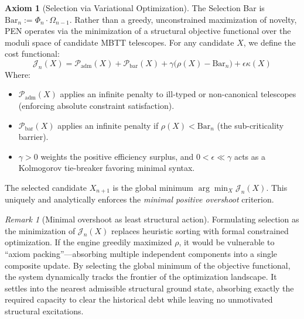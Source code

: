 \documentclass[11pt,a4paper]{article}
\theoremstyle{plain}
\theoremstyle{definition}
\newtheorem{axiom}[theorem]{Axiom}
\theoremstyle{remark}
\newtheorem{remark}[theorem]{Remark}
\begin{document}
\begin{axiom}[Selection via Variational Optimization]
\label{ax:selection}
The Selection Bar is $\mathrm{Bar}_n := \Phi_n \cdot \Omega_{n-1}$. Rather than a greedy, unconstrained maximization of novelty, PEN operates via the minimization of a structural objective functional over the moduli space of candidate MBTT telescopes. For any candidate $X$, we define the cost functional:
\begin{equation}
    \mathcal{J}_n(X) = \mathcal{P}_{\mathrm{adm}}(X) + \mathcal{P}_{\mathrm{bar}}(X) + \gamma \big( \rho(X) - \mathrm{Bar}_n \big) + \epsilon \kappa(X)
\end{equation}
Where:
\begin{itemize}[nosep]
    \item $\mathcal{P}_{\mathrm{adm}}(X)$ applies an infinite penalty to ill-typed or non-canonical telescopes (enforcing absolute constraint satisfaction).
    \item $\mathcal{P}_{\mathrm{bar}}(X)$ applies an infinite penalty if $\rho(X) < \mathrm{Bar}_n$ (the sub-criticality barrier).
    \item $\gamma > 0$ weights the positive efficiency surplus, and $0 < \epsilon \ll \gamma$ acts as a Kolmogorov tie-breaker favoring minimal syntax.
\end{itemize}
The selected candidate $X_{n+1}$ is the global minimum $\arg\min_X \mathcal{J}_n(X)$. This uniquely and analytically enforces the \emph{minimal positive overshoot} criterion.
\end{axiom}

\begin{remark}[Minimal overshoot as least structural action]
Formulating selection as the minimization of $\mathcal{J}_n(X)$ replaces heuristic sorting with formal constrained optimization. If the engine greedily maximized $\rho$, it would be vulnerable to ``axiom packing''—absorbing multiple independent components into a single composite update. By selecting the global minimum of the objective functional, the system dynamically tracks the frontier of the optimization landscape. It settles into the nearest admissible structural ground state, absorbing exactly the required capacity to clear the historical debt while leaving no unmotivated structural excitations.
\end{remark}
\end{document}
